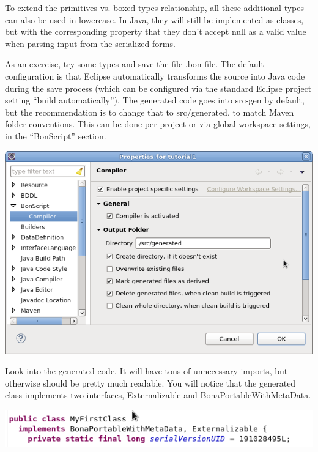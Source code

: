 \documentclass[11pt,a4paper,oneside]{article}
\begin{document}
To extend the primitives vs. boxed types relationship, all these additional types can also be used in lowercase. In Java, they will still be implemented as
classes, but with the corresponding property that they don't accept null as a valid value when parsing input from the serialized forms.

As an exercise, try some types and save the file {\ttfamily .bon} file. The default configuration is that Eclipse automatically transforms the source into
Java code during the save process (which can be configured via the standard Eclipse project setting ``build automatically''). The generated code goes into 
{\ttfamily src-gen} by default, but the recommendation is to change that to {\ttfamily src/generated}, to match Maven folder conventions.
This can be done per project or via global workspace settings, in the ``BonScript'' section.

\vspace{2mm}
\begin{center}
\includegraphics[scale=0.5]{images/tut1-003.png}
\end{center} 
 
Look into the generated code. It will have tons of unnecessary imports, but otherwise should be pretty much readable.
You will notice that the generated class implements two interfaces, {\ttfamily Externalizable} and {\ttfamily BonaPortableWithMetaData}.

\vspace{2mm}
\hspace{1cm}\includegraphics[scale=0.5]{images/tut1-004.png}
\end{document}
